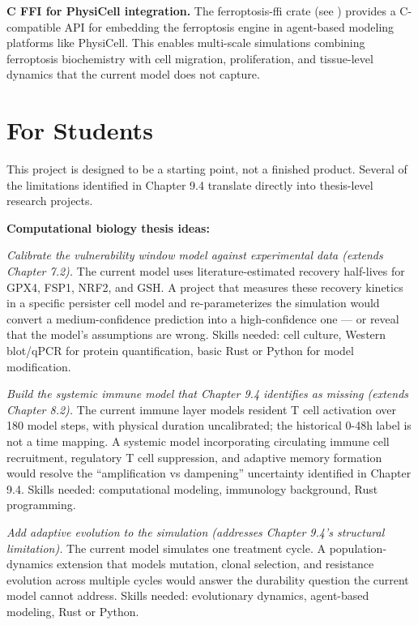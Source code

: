 \documentclass[11pt,twoside,openright]{report}
\begin{document}
\textbf{C FFI for PhysiCell integration.} The ferroptosis-ffi crate (see ) provides a C-compatible API for embedding the ferroptosis engine in agent-based modeling platforms like PhysiCell. This enables multi-scale simulations combining ferroptosis biochemistry with cell migration, proliferation, and tissue-level dynamics that the current model does not capture.

\section{For Students}

This project is designed to be a starting point, not a finished product. Several of the limitations identified in Chapter 9.4 translate directly into thesis-level research projects.

\textbf{Computational biology thesis ideas:}

\textit{Calibrate the vulnerability window model against experimental data (extends Chapter 7.2).} The current model uses literature-estimated recovery half-lives for GPX4, FSP1, NRF2, and GSH. A project that measures these recovery kinetics in a specific persister cell model and re-parameterizes the simulation would convert a medium-confidence prediction into a high-confidence one --- or reveal that the model's assumptions are wrong. Skills needed: cell culture, Western blot/qPCR for protein quantification, basic Rust or Python for model modification.

\textit{Build the systemic immune model that Chapter 9.4 identifies as missing (extends Chapter 8.2).} The current immune layer models resident T cell activation over 180 model steps, with physical duration uncalibrated; the historical 0-48h label is not a time mapping. A systemic model incorporating circulating immune cell recruitment, regulatory T cell suppression, and adaptive memory formation would resolve the ``amplification vs dampening'' uncertainty identified in Chapter 9.4. Skills needed: computational modeling, immunology background, Rust programming.

\textit{Add adaptive evolution to the simulation (addresses Chapter 9.4's structural limitation).} The current model simulates one treatment cycle. A population-dynamics extension that models mutation, clonal selection, and resistance evolution across multiple cycles would answer the durability question the current model cannot address. Skills needed: evolutionary dynamics, agent-based modeling, Rust or Python.
\end{document}
